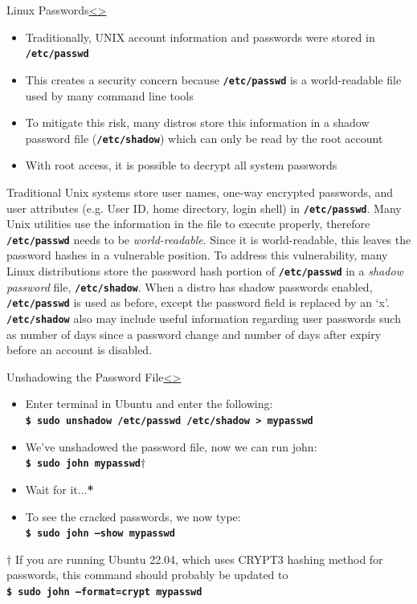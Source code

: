 \documentclass[12pt]{extarticle}
\newcommand{\code}[1]{\texttt{\bfseries#1}}
\newenvironment{instructionblock}{\Large\bgroup}{\egroup}
\begin{document}
\pagebreak
\begin{slide}{Linux Passwords}{\hyperref[slide 6]{\textless}\hyperref[slide 8]{\textgreater}}
\begin{instructionblock}
\begin{itemize}
\item Traditionally, UNIX account information and passwords were stored in \code{/etc/passwd}
\item This creates a security concern because \code{/etc/passwd} is a world-readable file used by many command line tools
\item To mitigate this risk, many distros store this information in a shadow password file (\code{/etc/shadow}) which can only be read by the root account
\item With root access, it is possible to decrypt all system passwords
\end{itemize}
\end{instructionblock}
\end{slide}
\vfill

Traditional Unix systems store user names, one-way encrypted passwords, and user attributes (e.g. User ID, home directory, login shell) in \code{/etc/passwd}. Many Unix utilities use the information in the file to execute properly, therefore \code{/etc/passwd} needs to be \textit{world-readable}. Since it is world-readable, this leaves the password hashes in a vulnerable position. To address this vulnerability, many Linux distributions store the password hash portion of \code{/etc/passwd} in a \textit{shadow password} file, \code{/etc/shadow}.
When a distro has shadow passwords enabled, \code{/etc/passwd} is used as before, except the password field is replaced by an `x'. \code{/etc/shadow} also may include useful information regarding user passwords such as number of days since a password change and number of days after expiry before an account is disabled. \cite{frampton}

\pagebreak
\begin{slide}{Unshadowing the Password File}{\hyperref[slide 8]{\textless}\hyperref[slide 10]{\textgreater}}
	\begin{instructionblock}
		\begin{itemize}
			\item Enter terminal in Ubuntu and enter the following:\\
				\code{\$ sudo unshadow /etc/passwd /etc/shadow > mypasswd} 	
			\item We've unshadowed the password file, now we can run john:\\
				\code{\$ sudo john mypasswd{\textbf{$\dagger$}}}
			\item{Wait for it...\textbf{*}}
			\item{To see the cracked passwords, we now type:}\\
				\code{\$ sudo john --show mypasswd}
		\end{itemize}
	\end{instructionblock}
\end{slide}
\textbf{$\dagger$} If you are running Ubuntu 22.04, which uses CRYPT3 hashing method for passwords, this command should probably be updated to\\ 
{\code{\$ sudo john --format=crypt mypasswd}}
\end{document}

